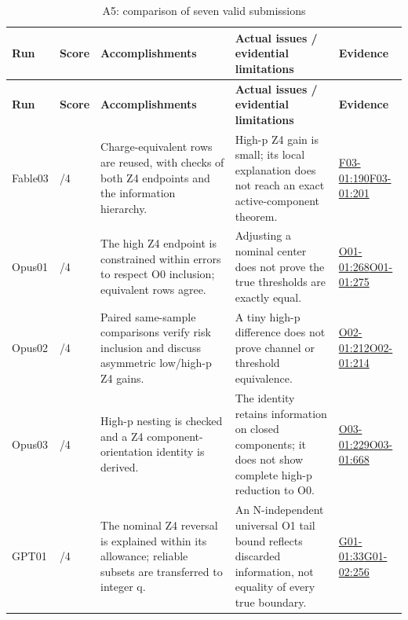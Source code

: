 \documentclass[11pt,a4paper]{article}
\begin{document}
{\fontsize{9.0}{12.6}\selectfont
\setlength{\tabcolsep}{2.5pt}
\begin{longtable}{>{\raggedright\arraybackslash}p{}>{\raggedright\arraybackslash}p{}>{\raggedright\arraybackslash}p{}>{\raggedright\arraybackslash}p{}>{\raggedright\arraybackslash}p{}}
\caption{A5: comparison of seven valid submissions}\\
\toprule
\textbf{Run} & \textbf{Score} & \textbf{Accomplishments} & \textbf{Actual issues /\allowbreak{} evidential limitations} & \textbf{Evidence}\tabularnewline
\midrule
\endfirsthead
\toprule
\textbf{Run} & \textbf{Score} & \textbf{Accomplishments} & \textbf{Actual issues /\allowbreak{} evidential limitations} & \textbf{Evidence}\tabularnewline
\midrule
\endhead
{}Fable03 & 4/\allowbreak{}4 & Charge-equivalent rows are reused,\allowbreak{} with checks of both Z4 endpoints and the information hierarchy. & High-p Z4 gain is small; its local explanation does not reach an exact active-component theorem. & \hyperref[src:F03-01]{F03-01:190}\newline \hyperref[src:F03-01]{F03-01:201}\tabularnewline
{}Opus01 & 4/\allowbreak{}4 & The high Z4 endpoint is constrained within errors to respect O0 inclusion; equivalent rows agree. & Adjusting a nominal center does not prove the true thresholds are exactly equal. & \hyperref[src:O01-01]{O01-01:268}\newline \hyperref[src:O01-01]{O01-01:275}\tabularnewline
{}Opus02 & 4/\allowbreak{}4 & Paired same-sample comparisons verify risk inclusion and discuss asymmetric low/\allowbreak{}high-p Z4 gains. & A tiny high-p difference does not prove channel or threshold equivalence. & \hyperref[src:O02-01]{O02-01:212}\newline \hyperref[src:O02-01]{O02-01:214}\tabularnewline
{}Opus03 & 4/\allowbreak{}4 & High-p nesting is checked and a Z4 component-orientation identity is derived. & The identity retains information on closed components; it does not show complete high-p reduction to O0. & \hyperref[src:O03-01]{O03-01:229}\newline \hyperref[src:O03-01]{O03-01:668}\tabularnewline
{}GPT01 & 4/\allowbreak{}4 & The nominal Z4 reversal is explained within its allowance; reliable subsets are transferred to integer q. & An N-independent universal O1 tail bound reflects discarded information,\allowbreak{} not equality of every true boundary. & \hyperref[src:G01-01]{G01-01:33}\newline \hyperref[src:G01-02]{G01-02:256}\tabularnewline

\end{longtable}}
\end{document}
